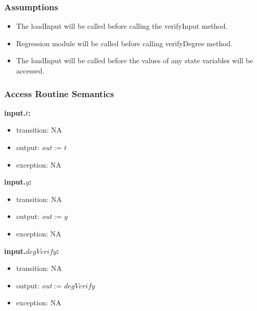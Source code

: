 \documentclass[12pt, titlepage]{article}
\begin{document}
\subsubsection{Assumptions}

\begin{itemize}
	
	\item The loadInput will be called before calling the verifyInput 
	method.
	\item Regression module will be called before calling verifyDegree method.
	\item The loadInput will be called before the values of any state variables 
	will be accessed.
	
\end{itemize}
\subsubsection{Access Routine Semantics}


\noindent \textbf{input.$t$:}
\begin{itemize}
	\item transition: NA 	
	\item output: \textit{out} := $t$
	\item exception: NA
\end{itemize}

\noindent \textbf{input.$y$:}
\begin{itemize}
	\item transition: NA 	
	\item output: \textit{out} := $y$
	\item exception: NA
\end{itemize}

\noindent \textbf{input.$degVerify$:}
\begin{itemize}
	\item transition: NA 	
	\item output: \textit{out} := $degVerify$
	\item exception: NA
\end{itemize}
\end{document}
